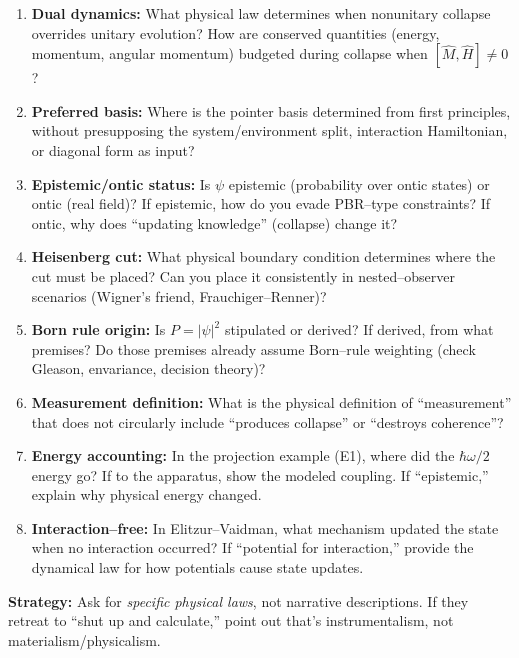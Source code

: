 \documentclass[11pt]{article}
\begin{document}
\begin{enumerate}[leftmargin=*]
  \item \textbf{Dual dynamics:} What physical law determines when nonunitary collapse overrides unitary evolution? How are conserved quantities (energy, momentum, angular momentum) budgeted during collapse when $[\hat M, \hat H]\ne 0$?
  
  \item \textbf{Preferred basis:} Where is the pointer basis determined from first principles, without presupposing the system/environment split, interaction Hamiltonian, or diagonal form as input?
  
  \item \textbf{Epistemic/ontic status:} Is $\psi$ epistemic (probability over ontic states) or ontic (real field)? If epistemic, how do you evade PBR--type constraints? If ontic, why does ``updating knowledge'' (collapse) change it?
  
  \item \textbf{Heisenberg cut:} What physical boundary condition determines where the cut must be placed? Can you place it consistently in nested--observer scenarios (Wigner's friend, Frauchiger--Renner)?
  
  \item \textbf{Born rule origin:} Is $P=|\psi|^2$ stipulated or derived? If derived, from what premises? Do those premises already assume Born--rule weighting (check Gleason, envariance, decision theory)?
  
  \item \textbf{Measurement definition:} What is the physical definition of ``measurement'' that does not circularly include ``produces collapse'' or ``destroys coherence''?
  
  \item \textbf{Energy accounting:} In the projection example (E1), where did the $\hbar\omega/2$ energy go? If to the apparatus, show the modeled coupling. If ``epistemic,'' explain why physical energy changed.
  
  \item \textbf{Interaction--free:} In Elitzur--Vaidman, what mechanism updated the state when no interaction occurred? If ``potential for interaction,'' provide the dynamical law for how potentials cause state updates.
\end{enumerate}

\textbf{Strategy:} Ask for \emph{specific physical laws}, not narrative descriptions. If they retreat to ``shut up and calculate,'' point out that's instrumentalism, not materialism/physicalism.
\end{document}
